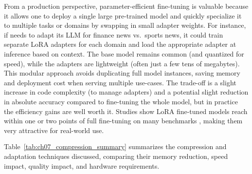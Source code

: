 From a production perspective, parameter-efficient fine-tuning is valuable because it allows one to deploy a single large pre-trained model and quickly specialize it to multiple tasks or domains by swapping in small adapter weights. For instance, if \ishtar{} needs to adapt its LLM for finance news vs.\ sports news, it could train separate LoRA adapters for each domain and load the appropriate adapter at inference based on context. The base model remains common (and quantized for speed), while the adapters are lightweight (often just a few tens of megabytes). This modular approach avoids duplicating full model instances, saving memory and deployment cost when serving multiple use-cases. The trade-off is a slight increase in code complexity (to manage adapters) and a potential slight reduction in absolute accuracy compared to fine-tuning the whole model, but in practice the efficiency gains are well worth it. Studies show LoRA fine-tuned models reach within one or two points of full fine-tuning on many benchmarks \cite{Hu2022LoRA}, making them very attractive for real-world use.

Table~\ref{tab:ch07_compression_summary} summarizes the compression and adaptation techniques discussed, comparing their memory reduction, speed impact, quality impact, and hardware requirements.

